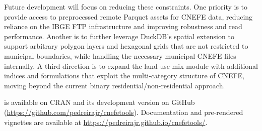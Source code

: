 Future development will focus on reducing these constraints. One
priority is to provide access to preprocessed remote Parquet assets for
CNEFE data, reducing reliance on the IBGE FTP infrastructure and
improving robustness and read performance. Another is to further
leverage DuckDB's spatial extension to support arbitrary polygon layers
and hexagonal grids that are not restricted to municipal boundaries,
while handling the necessary municipal CNEFE files internally. A third
direction is to expand the land use mix module with additional indices
and formulations that exploit the multi-category structure of CNEFE,
moving beyond the current binary residential/non-residential approach.

 is available on CRAN and its development version on
GitHub (\url{https://github.com/pedreirajr/cnefetools}). Documentation and
pre-rendered vignettes are available at
\url{https://pedreirajr.github.io/cnefetools/}.



\address{%
Jorge Ubirajara Pedreira Junior\\
Universidade Federal da Bahia\\%
Escola Politécnica\\ Salvador, Bahia, Brazil\\
%
\url{https://pedreirajr.github.io/website/}\\%
\textit{ORCiD: \href{https://orcid.org/0000-0002-8243-5395}{0000-0002-8243-5395}}\\%
\href{mailto:jorge.ubirajara@ufba.br}{\nolinkurl{jorge.ubirajara@ufba.br}}%
}

\address{%
Bruno Henrique Mioto Stabile\\
Universidade Estadual de Maringá\\%
Programa de Pós-Graduação em Ecologia de Ambientes Aquáticos Continentais (PEA-UEM)\\ Maringá, Paraná, Brazil\\
%
%
\textit{ORCiD: \href{https://orcid.org/0000-0002-3524-537X}{0000-0002-3524-537X}}\\%
\href{mailto:bhmstabile@gmail.com}{\nolinkurl{bhmstabile@gmail.com}}%
}
